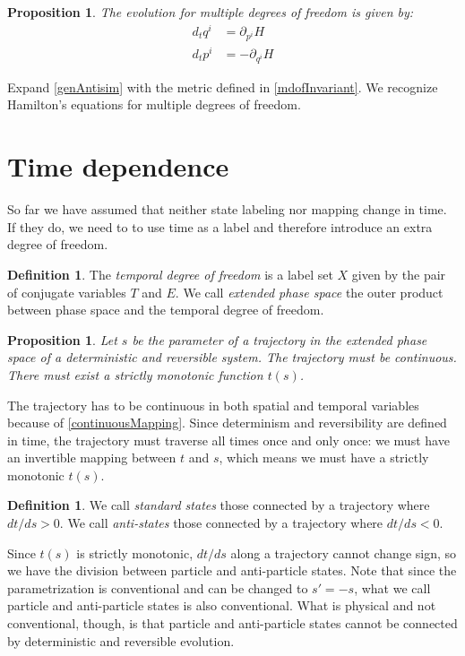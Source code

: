 \documentclass[twocolumn,floatfix,nofootinbib]{revtex4}   %
\theoremstyle{theorem}
\newtheorem{prop}[thm]{Proposition}
\theoremstyle{definition}
\newtheorem{defn}[thm]{Definition}
\begin{document}
\begin{prop}\label{mdofHam}
The evolution for multiple degrees of freedom is given by:
\begin{align*}
d_{t}q^i &= \partial_{p^i} H \\
d_{t}p^i &= - \partial_{q^i} H
\end{align*}
\end{prop}

Expand \ref{genAntisim} with the metric defined in \ref{mdofInvariant}. We recognize Hamilton's equations for multiple degrees of freedom.

\section{Time dependence}
So far we have assumed that neither state labeling nor mapping change in time. If they do, we need to to use time as a label and therefore introduce an extra degree of freedom.

\begin{defn}\label{tdof}
The \emph{temporal degree of freedom} is a label set $X$ given by the pair of conjugate variables $T$ and $E$. We call \emph{extended phase space} the outer product between phase space and the temporal degree of freedom.
\end{defn}

\begin{prop}\label{tdofMonotonic}
Let $s$ be the parameter of a trajectory in the extended phase space of a deterministic and reversible system. The trajectory must be continuous. There must exist a strictly monotonic function $t(s)$.
\end{prop}

The trajectory has to be continuous in both spatial and temporal variables because of \ref{continuousMapping}. Since determinism and reversibility are defined in time, the trajectory must traverse all times once and only once: we must have an invertible mapping between $t$ and $s$, which means we must have a strictly monotonic $t(s)$.

\begin{defn}\label{tdofAntistates}
We call \emph{standard states} those connected by a trajectory where $dt/ds>0$. We call \emph{anti-states} those connected by a trajectory where $dt/ds<0$.
\end{defn}

Since $t(s)$ is strictly monotonic, $dt/ds$ along a trajectory cannot change sign, so we have the division between particle and anti-particle states. Note that since the parametrization is conventional and can be changed to $s'=-s$, what we call particle and anti-particle states is also conventional. What is physical and not conventional, though, is that particle and anti-particle states cannot be connected by deterministic and reversible evolution.
\end{document}
